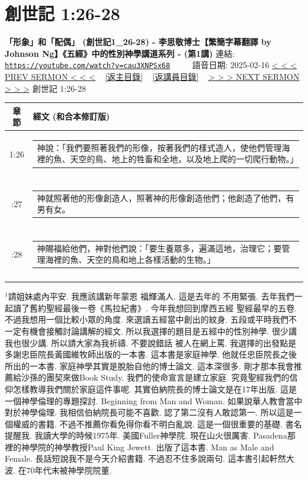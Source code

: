 \documentclass{book}
\begin{document}
\section{創世記 1:26-28}
\label{sec:cau3XNPSx68}
\textbf{「形象」和「配偶」 (創世記1\_26-28) - 李思敬博士【繁簡字幕翻譯 by Johnson Ng】《五經》中的性別神學講道系列 - (第1講)}
\newline
\newline
連結: \href{https://youtube.com/watch?v=cau3XNPSx68}{\texttt{https://youtube.com/watch?v=cau3XNPSx68}} ~~~~ 語音日期: 2025-02-16
\newline
\newline
\hyperref[sec:qbcjpAyQDGE]{< < < PREV SERMON < < <}
~
\hyperlink{toc}{[返主目錄]}
~
\hyperref[ch:preacher5]{[返講員目錄]}
~
\hyperref[sec:dX_CJYSfYFI]{> > > NEXT SERMON > > >}
\newline
\newline
創世記 1:26-28
\newline
\begin{longtable}{cl}
\hline
\hline
章節 & 經文 (和合本修訂版)\\
\hline
1:26 & \begin{tabularx}{0.7\textwidth}{X} 神說：「我們要照著我們的形像，按著我們的樣式造人，使他們管理海裡的魚、天空的鳥、地上的牲畜和全地，以及地上爬的一切爬行動物。」 \end{tabularx} \\ \\ \relax
1:27 & \begin{tabularx}{0.7\textwidth}{X} 神就照著他的形像創造人，照著神的形像創造他們；他創造了他們，有男有女。 \end{tabularx} \\ \\ \relax
1:28 & \begin{tabularx}{0.7\textwidth}{X} 神賜福給他們，神對他們說：「要生養眾多，遍滿這地，治理它；要管理海裡的魚、天空的鳥和地上各樣活動的生物。」 \end{tabularx} \\ \\
[1ex]
\hline
\hline
\end{longtable}
$^{1}$請姐妹處內平安.
我應該講新年蒙恩 福輝滿人.
這是去年的 不用緊張.
去年我們一起讀了舊約聖經最後一卷《馬拉紀書》.
今年我想回到摩西五經 聖經最早的五卷.
不過我想用一個比較小眾的角度.
來選讀五經當中創出的紋身.
五段或平時我們不一定有機會接觸討論講解的經文.
所以我選擇的題目是五經中的性別神學.
很少講 我也很少講.
所以請大家為我祈禱.
不要說錯話 被人在網上罵.
我選擇的出發點是多謝忠臣院長黃國維牧師出版的一本書.
這本書是家庭神學.
他就任忠臣院長之後所出的一本書.
家庭神學其實是脫胎自他的博士論文.
這本深很多.
剛才那本我會推薦給沙孫的團契來做Book Study.
我們的使命宣言是建立家庭.
究竟聖經我們的信仰怎樣教導我們關於家庭這件事呢.
其實伯納院長的博士論文是在17年出版.
這是一個神學倫理的專題探討.
Beginning from Man and Woman.
如果說華人教會當中對於神學倫理.
我相信伯納院長可能不喜歡.
認了第二沒有人敢認第一.
所以這是一個權威的書籍.
不過不推薦你看免得你看不明白亂說.
這是一個很重要的基礎.
書名提醒我.
我讀大學的時候1975年.
美國Fuller神學院.
現在山火很厲害.
Pasadena那裡的神學院的神學教授Paul King Jewett.
出版了這本書.
Man as Male and Female.
長話短說我不是今天介紹書籍.
不過忍不住多說兩句.
這本書引起軒然大波.
在70年代末被神學院院董.
\end{document}
